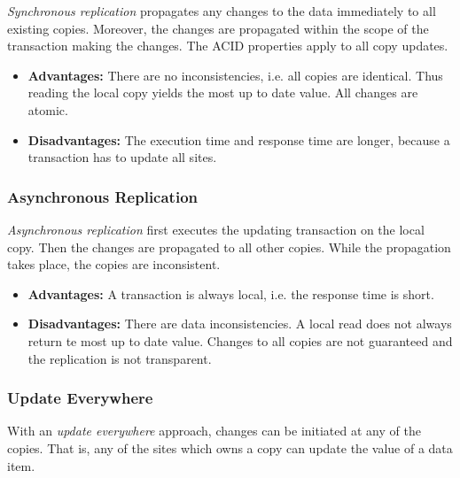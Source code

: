 \emph{Synchronous replication} propagates any changes to the data immediately to all existing copies. Moreover, the changes are propagated within the scope of the transaction making the changes. The ACID properties apply to all copy updates.

\begin{itemize}
\item \textbf{Advantages:} There are no inconsistencies, i.e. all copies are identical. Thus reading the local copy yields the most up to date value. All changes are atomic.
\item \textbf{Disadvantages:} The execution time and response time are longer, because a transaction has to update all sites.
\end{itemize}




\subsubsection{Asynchronous Replication}

\emph{Asynchronous replication} first executes the updating transaction on the local copy. Then the changes are propagated to all other copies. While the propagation takes place, the copies are inconsistent.

\begin{itemize}
\item \textbf{Advantages:} A transaction is always local, i.e. the response time is short.
\item \textbf{Disadvantages:} There are data inconsistencies. A local read does not always return te most up to date value. Changes to all copies are not guaranteed and the replication is not transparent.
\end{itemize}




\subsubsection{Update Everywhere}

With an \emph{update everywhere} approach, changes can be initiated at any of the copies. That is, any of the sites which owns a copy can update the value of a data item.

